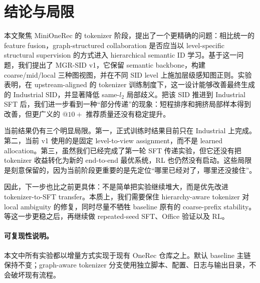 \section{结论与局限}
\label{sec:conclusion}

本文聚焦 MiniOneRec 的 tokenizer 阶段，提出了一个更精确的问题：相比统一的 feature fusion，graph-structured collaboration 是否应当以 level-specific structural supervision 的方式进入 hierarchical semantic ID 学习。基于这一问题，我们提出了 MGR-SID v1，它保留 semantic \rqvae{} backbone，构建 coarse/mid/local 三种图视图，并在不同 SID level 上施加层级感知图正则。实验表明，在 upstream-aligned 的 tokenizer 训练制度下，这一设计能够改善最终生成的 Industrial SID，并显著降低 same-$l_2$ 局部歧义。把该 SID 推进到 Industrial SFT 后，我们进一步看到一种“部分传递”的现象：短程排序和拥挤局部样本得到改善，但更广义的 $@10+$ 推荐质量还没有稳定提升。

当前结果仍有三个明显局限。第一，正式训练时结果目前只在 Industrial 上完成。第二，当前 v1 使用的是固定 level-to-view assignment，而不是 learned allocation。第三，虽然我们已经完成了第一轮 SFT 传递实验，但它还没有把 tokenizer 收益转化为新的 end-to-end 最优系统，RL 也仍然没有启动。这些局限是刻意保留的，因为当前阶段更重要的是先定位“哪里已经对了，哪里还没接住”。

因此，下一步也比之前更具体：不是简单把实验继续堆大，而是优先改进 tokenizer-to-SFT transfer。本质上，我们需要保住 hierarchy-aware tokenizer 对 local ambiguity 的修复，同时尽量不牺牲 baseline 原有的 coarse-prefix stability。等这一步更稳之后，再继续做 repeated-seed SFT、Office 验证以及 RL。

\paragraph{可复现性说明。}
本文中所有实验都以增量方式实现于现有 OneRec 仓库之上。默认 baseline 主链保持不变；graph-aware tokenizer 分支使用独立脚本、配置、日志与输出目录，不会破坏现有流程。
